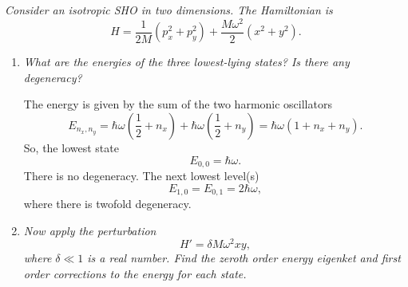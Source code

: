\begin{example}
	\emph{Consider an isotropic SHO in two dimensions. The Hamiltonian is}\newline
	\begin{equation}
		H=\frac{1}{2M}(p_x^2+p^2_y)+\frac{M\omega ^2}{2}(x^2+y^2).
	\end{equation} 
	\begin{enumerate}
		\item \emph{What are the energies of the three lowest-lying states? Is there any degeneracy?}\newline
		
		The energy is given by the sum of the two harmonic oscillators
		\begin{equation}
			E_{n_x,n_y}=\hbar\omega(\frac{1}{2}+n_x)+\hbar\omega(\frac{1}{2}+n_y)=\hbar \omega(1+n_x+n_y).
		\end{equation} 
		So, the lowest state
		\begin{equation}
			E_{0,0}=\hbar \omega.
		\end{equation} 
		There is no degeneracy. The next lowest level(s)
		\begin{equation}
			E_{1,0}=E_{0,1}=2\hbar \omega,
		\end{equation} 
		where there is twofold degeneracy.\newline
		
		\item \emph{Now apply the perturbation}
		\begin{equation}
			H'=\delta M\omega^2xy,
		\end{equation} 
		\emph{where $\delta\ll1$ is a real number. Find the zeroth order energy eigenket and first order corrections to the energy for each state.}\newline
		

\end{enumerate}
\end{example}
